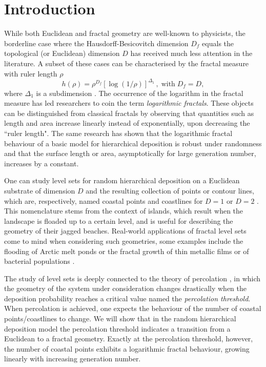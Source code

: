 \documentclass[amsmath,amssymb,amsfonts,aps,pre,preprint,superscriptaddress,bibnotes,showpacs,showkeys,longbibliography,nofootinbib]{revtex4-1}
\begin{document}
\maketitle

\section{Introduction}

While both Euclidean and fractal geometry  are well-known to physicists, the borderline case where the Hausdorff-Besicovitch dimension $D_f$ equals the topological (or Euclidean) dimension $D$ has received much less attention in the literature. A subset of these cases can be characterised by the fractal measure with ruler length $\rho$
\begin{equation}
    \label{eq:measure}
    h(\rho) = \rho^{D_f} \left[\log{(1/\rho)}\right]^{\Delta_1}\, , \; \mbox{with} \; D_f = D,
\end{equation}
where $\Delta_1$ is a subdimension \cite{Mandelbrot}. The occurrence of the logarithm in the fractal measure has led  researchers \cite{INDEKEU1998294} to coin the term \textsl{logarithmic fractals}. These objects can be distinguished from classical fractals by observing that quantities such as length and area increase linearly instead of exponentially, upon decreasing the ``ruler length". The same research has shown that the logarithmic fractal behaviour of a basic model for hierarchical deposition is robust under randomness and that the surface length or area, asymptotically for large generation number, increases by a constant. 

One can study level sets for random hierarchical deposition on a Euclidean substrate of dimension $D$ and the resulting collection of points or contour lines, which are, respectively, named coastal points and coastlines for  $D=1$ or $D=2$ \cite{INDEKEU2000135}. This nomenclature stems from the context of islands, which result when the landscape is floaded up to a certain level, and is useful for describing the geometry of their jagged beaches. Real-world applications of fractal level sets come to mind when considering such geometries, some examples include the flooding of Arctic melt ponds \cite{Bowen2018} or the fractal growth of thin metallic films \cite{AMINIRASTABI2020122261} or of bacterial populations \cite{INDEKEUSZNAJD,INDEKEU200414}.

The study of level sets is deeply connected to the theory of percolation \cite{stauffer_1992,STAUFFER19791}, in which the geometry of the system under consideration changes drastically when the deposition probability reaches a critical value named the \textsl{percolation threshold}. When percolation is achieved, one expects the behaviour of the number of coastal points/coastlines to change. We will show that in the random hierarchical deposition model the percolation threshold indicates a transition from a Euclidean to a fractal geometry. Exactly at the percolation threshold, however, the number of coastal points exhibits a logarithmic fractal behaviour, growing linearly with increasing generation number.
\end{document}
